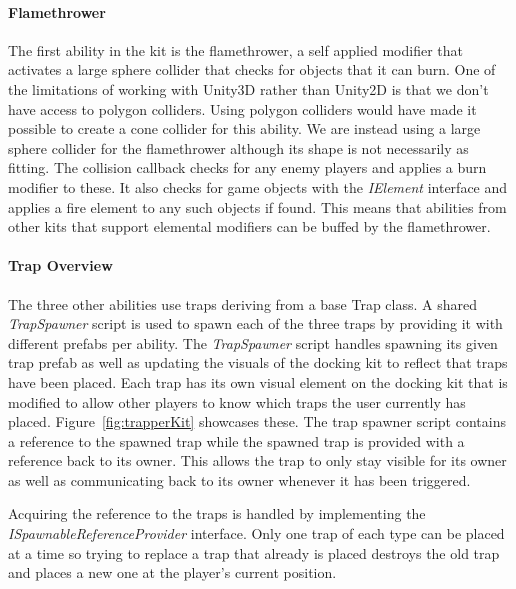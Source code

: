 \paragraph{Flamethrower}
The first ability in the kit is the flamethrower, a self applied modifier that activates a large sphere collider that checks for objects that it can burn. One of the limitations of working with Unity3D rather than Unity2D is that we don't have access to polygon colliders. Using polygon colliders would have made it possible to create a cone collider for this ability. We are instead using a large sphere collider for the flamethrower although its shape is not necessarily as fitting.
The collision callback checks for any enemy players and applies a burn modifier to these. It also checks for game objects with the \emph{IElement} interface and applies a fire element to any such objects if found. This means that abilities from other kits that support elemental modifiers can be buffed by the flamethrower.

\paragraph{Trap Overview}
The three other abilities use traps deriving from a base Trap class. A shared \emph{TrapSpawner} script is used to spawn each of the three traps by providing it with different prefabs per ability. 
The \emph{TrapSpawner} script handles spawning its given trap prefab as well as updating the visuals of the docking kit to reflect that traps have been placed. Each trap has its own visual element on the docking kit that is modified to allow other players to know which traps the user currently has placed. Figure~\ref{fig:trapperKit} showcases these.
The trap spawner script contains a reference to the spawned trap while the spawned trap is provided with a reference back to its owner. This allows the trap to only stay visible for its owner as well as communicating back to its owner whenever it has been triggered. 

Acquiring the reference to the traps is handled by implementing the \emph{ISpawnableReferenceProvider} interface. Only one trap of each type can be placed at a time so trying to replace a trap that already is placed destroys the old trap and places a new one at the player's current position.  

